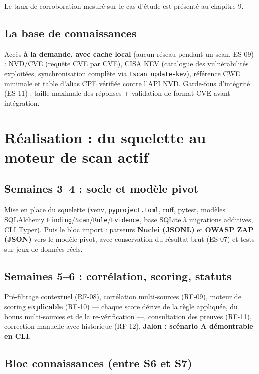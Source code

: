 \documentclass[11pt,a4paper]{report}
\newcommand{\code}[1]{\texttt{#1}}
\begin{document}
Le taux de corroboration mesuré sur le cas d'étude est présenté au chapitre 9.

\section{La base de connaissances}

Accès \textbf{à la demande, avec cache local} (aucun réseau pendant un scan, ES-09) :
NVD/CVE (requête CVE par CVE), CISA KEV (catalogue des vulnérabilités exploitées,
synchronisation complète via \code{tscan update-kev}), référence CWE minimale et table
d'alias CPE vérifiée contre l'API NVD. Garde-fous d'intégrité (ES-11) : taille maximale des
réponses + validation de format CVE avant intégration.

\chapter{Réalisation : du squelette au moteur de scan actif}

\section{Semaines 3--4 : socle et modèle pivot}

Mise en place du squelette (venv, \code{pyproject.toml}, ruff, pytest, modèles SQLAlchemy
\code{Finding}/\code{Scan}/\code{Rule}/\code{Evidence}, base SQLite à migrations additives,
CLI Typer). Puis le bloc import : parseurs \textbf{Nuclei (JSONL)} et \textbf{OWASP ZAP
(JSON)} vers le modèle pivot, avec conservation du résultat brut (ES-07) et tests sur jeux
de données réels.

\section{Semaines 5--6 : corrélation, scoring, statuts}

Pré-filtrage contextuel (RF-08), corrélation multi-sources (RF-09), moteur de scoring
\textbf{explicable} (RF-10) --- chaque score dérive de la règle appliquée, du bonus
multi-sources et de la re-vérification ---, consultation des preuves (RF-11), correction
manuelle avec historique (RF-12). \textbf{Jalon : scénario A démontrable en CLI}.

\section{Bloc connaissances (entre S6 et S7)}
\end{document}
